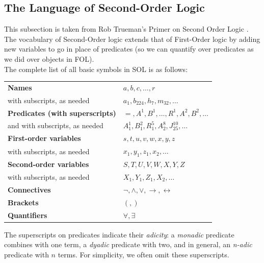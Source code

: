 \subsection{The Language of Second-Order Logic}
This subsection is taken from Rob Trueman's Primer on Second Order Logic \cite{truemanSOL}. The vocabulary of Second-Order logic extends that of First-Order logic by adding new variables to go in place of predicates (so we can quantify over predicates as we did over objects in FOL). \\ \steezybreak
The complete list of all basic symbols in SOL is as follows:
\vspace{-0.1in}
\begin{table}[h]
    \centering
    \begin{tabular}{ll}
        \textbf{Names} & $ a, b, c, \dots, r $ \\
        with subscripts, as needed & $ a_1, b_{224}, h_7, m_{32}, \dots $ \\[8pt]

        \textbf{Predicates (with superscripts)} & $ =, A^1, B^1, \dots, R^1, A^2, B^2, \dots $ \\
        and with subscripts, as needed & $ A_1^1, B_1^2, R_1^5, A_2^8, J_{25}^{10}, \dots $ \\[8pt]

        \textbf{First-order variables} & $ s, t, u, v, w, x, y, z $ \\
        with subscripts, as needed & $ x_1, y_1, z_1, x_2, \dots $ \\[8pt]

        \textbf{Second-order variables} & $ S, T, U, V, W, X, Y, Z $ \\
        with subscripts, as needed & $ X_1, Y_1, Z_1, X_2, \dots $ \\[8pt]

        \textbf{Connectives} & $ \neg, \wedge, \vee, \rightarrow, \leftrightarrow $ \\[8pt]

        \textbf{Brackets} & $ (, ) $ \\[8pt]

        \textbf{Quantifiers} & $ \forall, \exists $
    \end{tabular}
\end{table}

The superscripts on predicates indicate their \textit{adicity}: a \textit{monadic} predicate combines with one term, a \textit{dyadic} predicate with two, and in general, an \textit{n-adic} predicate with $n$ terms. For simplicity, we often omit these superscripts.

